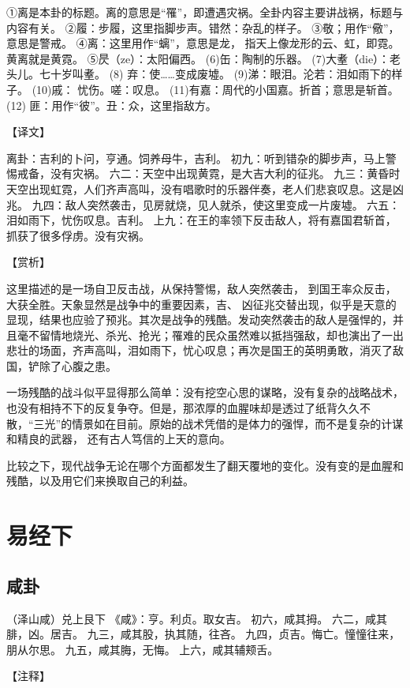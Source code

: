 \documentclass[a4paper,12pt,UTF8,twoside]{ctexbook}
\begin{document}
①离是本卦的标题。离的意思是“罹”，即遭遇灾祸。全卦内容主要讲战祸，标题与内容有关。
②履：步履，这里指脚步声。错然：杂乱的样子。
③敬；用作“儆”，意思是警戒。
④离：这里用作“螭”，意思是龙， 指天上像龙形的云、虹，即霓。黄离就是黄霓。
⑤昃（ze）：太阳偏西。
(6)缶：陶制的乐器。
(7)大耊（die）：老头儿。七十岁叫耊。
(8) 弃：使……变成废墟。
(9)涕：眼泪。沦若：泪如雨下的样子。
(10)戚： 忧伤。嗟：叹息。
(11)有嘉：周代的小国嘉。折首；意思是斩首。
(12) 匪：用作“彼”。丑：众，这里指敌方。

【译文】

离卦：吉利的卜问，亨通。饲养母牛，吉利。
初九：听到错杂的脚步声，马上警惕戒备，没有灾祸。
六二：天空中出现黄霓，是大吉大利的征兆。
九三：黄昏时天空出现虹霓，人们齐声高叫，没有唱歌时的乐器伴奏，老人们悲哀叹息。这是凶兆。
九四：敌人突然袭击，见房就烧，见人就杀，使这里变成一片废墟。
六五：泪如雨下，忧伤叹息。吉利。
上九：在王的率领下反击敌人，将有嘉国君斩首，抓获了很多俘虏。没有灾祸。

【赏析】

这里描述的是一场自卫反击战，从保持警惕，敌人突然袭击， 到国王率众反击，大获全胜。天象显然是战争中的重要因素，吉、 凶征兆交替出现，似乎是天意的显现，结果也应验了预兆。其次是战争的残酷。发动突然袭击的敌人是强悍的，并且毫不留情地烧光、杀光、抢光；罹难的民众虽然难以抵挡强敌，却也演出了一出悲壮的场面，齐声高叫，泪如雨下，忧心叹息；再次是国王的英明勇敢，消灭了敌国，铲除了心腹之患。

一场残酷的战斗似平显得那么简单：没有挖空心思的谋略，没有复杂的战略战术，也没有相持不下的反复争夺。但是，那浓厚的血腥味却是透过了纸背久久不散，“三光”的情景如在目前。原始的战术凭借的是体力的强悍，而不是复杂的计谋和精良的武器， 还有古人笃信的上天的意向。

比较之下，现代战争无论在哪个方面都发生了翻天覆地的变化。没有变的是血腥和残酷，以及用它们来换取自己的利益。

\part{易经下}

\chapter{咸卦}

（泽山咸）兑上艮下
《咸》：亨。利贞。取女吉。
初六，咸其拇。
六二，咸其腓，凶。居吉。
九三，咸其股，执其随，往吝。
九四，贞吉。悔亡。憧憧往来，朋从尔思。
九五，咸其脢，无悔。
上六，咸其辅颊舌。

【注释】
\end{document}
